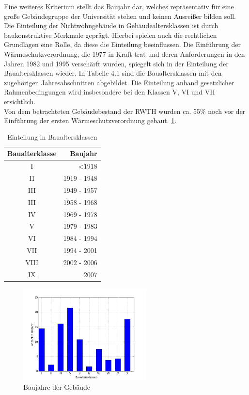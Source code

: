 Eine weiteres Kriterium stellt das Baujahr dar, welches repräsentativ für eine große Gebäudegruppe der Universität stehen und keinen Ausreißer bilden soll. Die Einteilung der Nichtwohngebäude in Gebäudealtersklassen ist durch baukonstruktive Merkmale geprägt.
Hierbei spielen auch die rechtlichen Grundlagen eine Rolle, da diese die Einteilung beeinflussen. Die Einführung der Wärmeschutzverordnung, die 1977 in Kraft trat und deren Anforderungen in den Jahren 1982 und 1995 verschärft wurden, spiegelt sich in der Einteilung der Baualtersklassen wieder. In Tabelle 4.1 sind die Baualtersklassen mit den zugehörigen Jahresabschnitten abgebildet. Die Einteilung anhand gesetzlicher Rahmenbedingungen wird insbesondere bei den Klassen V, VI und VII ersichtlich.\\
Von dem betrachteten Gebäudebestand der RWTH wurden ca. 55\% noch vor der Einführung der ersten Wärmeschutzverordnung gebaut. 
 \ref{tab:Tabelle}. 

\begin{table}[htb]
\centering
\caption{Einteilung in Baualtersklassen}\vspace{6pt}
\label{fig:Baualterklassen Verteilung}
\begin{tabular}{cr} 
\hline
\textbf{Baualterklasse} & \textbf{Baujahr}\\
\hline 
I & <1918 \\  
II & 1919 - 1948 \\
III & 1949 - 1957 \\
III & 1958 - 1968 \\
IV & 1969 - 1978 \\
V &  1979 - 1983\\
VI & 1984 - 1994\\
VII & 1994 - 2001\\
VIII & 2002 - 2006\\
IX & 2007 \\
\hline 
\end{tabular}
\label{tab:Tabelle}
\end{table}

\begin{figure}[htb]
	\centering
		\includegraphics[width=0.60\textwidth]{Pictures/BaualtersklassenProzentual.png}
	\caption{Baujahre der Gebäude}
	\label{fig:Baujahre der Gebäude}
\end{figure}

